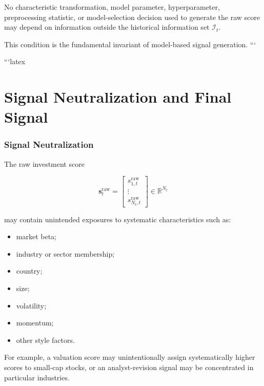 \documentclass[11pt,a4paper]{article}
\begin{document}
No characteristic transformation, model parameter, hyperparameter,
preprocessing statistic, or model-selection decision used to generate the raw
score may depend on information outside the historical information set
$\mathcal{I}_t$.

This condition is the fundamental invariant of model-based signal generation.
```

```latex
\part{Signal Neutralization and Final Signal}

\section{Signal Neutralization}
\label{sec:signal_neutralization}

The raw investment score

\begin{equation}
\mathbf{s}_t^{\mathrm{raw}}
=
\begin{bmatrix}
s_{1,t}^{\mathrm{raw}}
\\
\vdots
\\
s_{N_t,t}^{\mathrm{raw}}
\end{bmatrix}
\in
\mathbb{R}^{N_t}
\end{equation}

may contain unintended exposures to systematic characteristics such as:

\begin{itemize}
    \item market beta;
    \item industry or sector membership;
    \item country;
    \item size;
    \item volatility;
    \item momentum;
    \item other style factors.
\end{itemize}

For example, a valuation score may unintentionally assign systematically higher
scores to small-cap stocks, or an analyst-revision signal may be concentrated
in particular industries.
\end{document}
